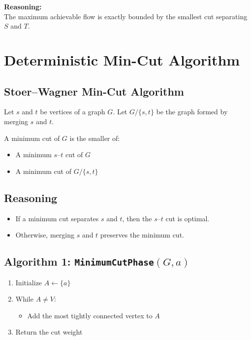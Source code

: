 \documentclass[11pt]{article}
\begin{document}
\noindent
\textbf{Reasoning:} \\
The maximum achievable flow is exactly bounded by the smallest cut separating $S$ and $T$.


\section{Deterministic Min-Cut Algorithm}

\subsection{Stoer--Wagner Min-Cut Algorithm}

Let $s$ and $t$ be vertices of a graph $G$.  
Let $G/\{s,t\}$ be the graph formed by merging $s$ and $t$.

\medskip
A minimum cut of $G$ is the smaller of:
\begin{itemize}
    \item A minimum $s$--$t$ cut of $G$
    \item A minimum cut of $G/\{s,t\}$
\end{itemize}

\subsection{Reasoning}

\begin{itemize}
    \item If a minimum cut separates $s$ and $t$, then the $s$--$t$ cut is optimal.
    \item Otherwise, merging $s$ and $t$ preserves the minimum cut.
\end{itemize}

\subsection*{Algorithm 1: \texttt{MinimumCutPhase$(G,a)$}}

\begin{enumerate}
    \item Initialize $A \leftarrow \{a\}$
    \item While $A \neq V$:
    \begin{itemize}
        \item Add the most tightly connected vertex to $A$
    \end{itemize}
    \item Return the cut weight
\end{enumerate}
\end{document}
